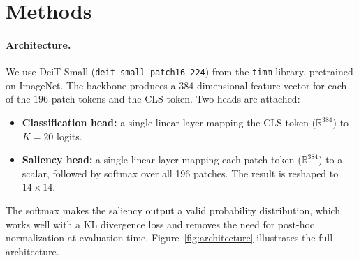 \documentclass{article}
\begin{document}
\section{Methods}

\paragraph{Architecture.}
We use DeiT-Small (\texttt{deit\_small\_patch16\_224}) from the \texttt{timm} library, pretrained on ImageNet. The backbone produces a $384$-dimensional feature vector for each of the $196$ patch tokens and the CLS token. Two heads are attached:
\begin{itemize}
    \item \textbf{Classification head:} a single linear layer mapping the CLS token ($\mathbb{R}^{384}$) to $K\!=\!20$ logits.
    \item \textbf{Saliency head:} a single linear layer mapping each patch token ($\mathbb{R}^{384}$) to a scalar, followed by softmax over all 196 patches. The result is reshaped to $14\!\times\!14$.
\end{itemize}
The softmax makes the saliency output a valid probability distribution, which works well with a KL divergence loss and removes the need for post-hoc normalization at evaluation time. Figure~\ref{fig:architecture} illustrates the full architecture.
\end{document}
